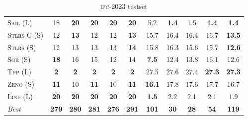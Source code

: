 \documentclass[11pt]{article}
\begin{document}
\begin{table}[tb]
{\begin{tabular}{|l||ccccc||ccccc||}
\textsc{Sail} (L)&18&\textbf{20}&\textbf{20}&\textbf{20}&\textbf{20}&5.2&\textbf{1.4}&1.5&\textbf{1.4}&\textbf{1.4}\\
\textsc{Stlrs-C} (S)&12&\textbf{13}&12&12&\textbf{13}&15.7&16.4&16.4&16.7&\textbf{13.5}\\
\textsc{Stlrs} (S)&12&13&13&13&\textbf{14}&15.8&16.3&15.6&15.7&\textbf{12.6}\\
\textsc{Sgr} (S)&\textbf{18}&16&15&12&14&\textbf{7.5}&12.4&13.8&16.1&12.6\\
\textsc{Tpp} (L)&\textbf{2}&\textbf{2}&\textbf{2}&\textbf{2}&\textbf{2}&27.5&27.6&27.4&\textbf{27.3}&\textbf{27.3}\\
\textsc{Zeno} (S)&\textbf{11}&10&\textbf{11}&10&\textbf{11}&\textbf{16.1}&17.8&17.6&17.7&16.7\\
\textsc{Line} (L)&\textbf{20}&\textbf{20}&\textbf{20}&\textbf{20}&\textbf{20}&\textbf{1.5}&2.2&2.1&2.1&1.9
\\\hline
\textit{Best}&\textbf{279}&\textbf{280}&\textbf{281}&\textbf{276}&\textbf{291}&\textbf{101}&\textbf{30}&\textbf{28}&\textbf{54}&\textbf{119}\\\hline

        \end{tabular}}
        \caption{\textsc{ipc}-2023 testset}
        \label{tab:ipc}
        \end{table}
        
\end{document}

